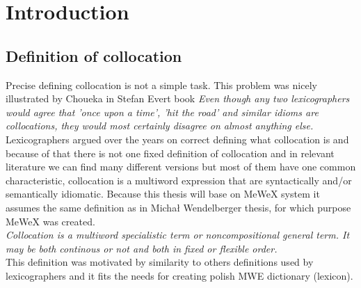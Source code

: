 
\chapter{Introduction}

\section{Definition of collocation}


Precise defining collocation is not a simple task. This problem was nicely illustrated by Choueka in Stefan Evert book 
\textit {Even though any two lexicographers would agree that ’once upon a time’, ’hit the road’ and similar idioms are collocations,
they would most certainly disagree on almost anything else.}
Lexicographers argued over the years on correct defining what collocation is and because of that there is not one fixed definition of collocation  
and in relevant literature we can find many different versions but most of them have one common characteristic, 
collocation is a multiword expression that are syntactically and/or semantically idiomatic. Because this thesis will base on MeWeX system 
it assumes the same definition as in Michał Wendelberger thesis, for which purpose MeWeX was created.
\\ \textit{Collocation is a multiword specialistic term or noncompositional general term. 
It may be both continous or not and both in fixed or flexible order.} \\
This definition was motivated by similarity to others definitions used by lexicographers and it fits the needs for creating polish MWE dictionary (lexicon). 


